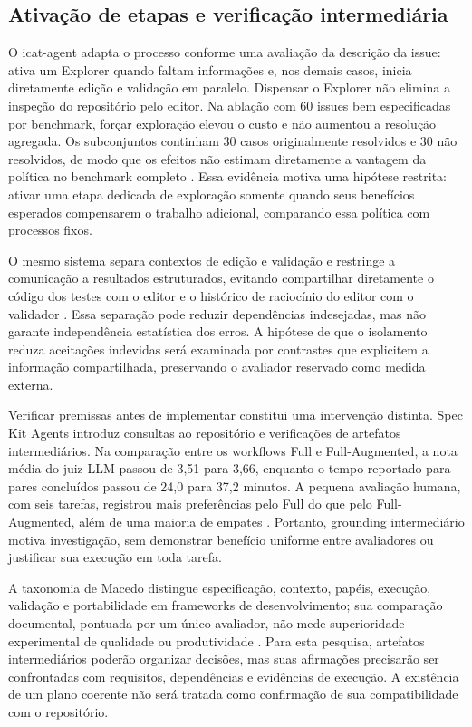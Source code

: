 \subsection{Ativação de etapas e verificação intermediária}

O icat-agent adapta o processo conforme uma avaliação da descrição da issue: ativa um Explorer quando faltam informações e, nos demais casos, inicia diretamente edição e validação em paralelo. Dispensar o Explorer não elimina a inspeção do repositório pelo editor. Na ablação com 60 issues bem especificadas por benchmark, forçar exploração elevou o custo e não aumentou a resolução agregada. Os subconjuntos continham 30 casos originalmente resolvidos e 30 não resolvidos, de modo que os efeitos não estimam diretamente a vantagem da política no benchmark completo \cite{Chen2026IcatAgent}. Essa evidência motiva uma hipótese restrita: ativar uma etapa dedicada de exploração somente quando seus benefícios esperados compensarem o trabalho adicional, comparando essa política com processos fixos.

O mesmo sistema separa contextos de edição e validação e restringe a comunicação a resultados estruturados, evitando compartilhar diretamente o código dos testes com o editor e o histórico de raciocínio do editor com o validador \cite{Chen2026IcatAgent}. Essa separação pode reduzir dependências indesejadas, mas não garante independência estatística dos erros. A hipótese de que o isolamento reduza aceitações indevidas será examinada por contrastes que explicitem a informação compartilhada, preservando o avaliador reservado como medida externa.

Verificar premissas antes de implementar constitui uma intervenção distinta. Spec Kit Agents introduz consultas ao repositório e verificações de artefatos intermediários. Na comparação entre os workflows Full e Full-Augmented, a nota média do juiz LLM passou de 3,51 para 3,66, enquanto o tempo reportado para pares concluídos passou de 24,0 para 37,2 minutos. A pequena avaliação humana, com seis tarefas, registrou mais preferências pelo Full do que pelo Full-Augmented, além de uma maioria de empates \cite{Taghavi2026SpecKitAgents}. Portanto, grounding intermediário motiva investigação, sem demonstrar benefício uniforme entre avaliadores ou justificar sua execução em toda tarefa.

A taxonomia de Macedo distingue especificação, contexto, papéis, execução, validação e portabilidade em frameworks de desenvolvimento; sua comparação documental, pontuada por um único avaliador, não mede superioridade experimental de qualidade ou produtividade \cite{Macedo2026PromptProcess}. Para esta pesquisa, artefatos intermediários poderão organizar decisões, mas suas afirmações precisarão ser confrontadas com requisitos, dependências e evidências de execução. A existência de um plano coerente não será tratada como confirmação de sua compatibilidade com o repositório.

